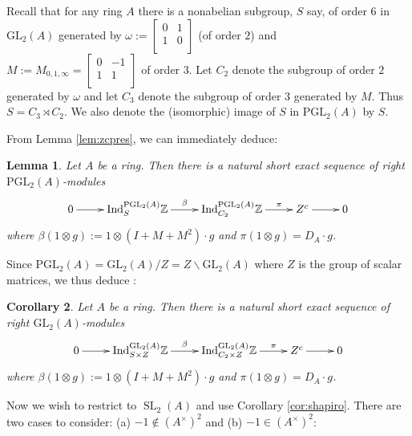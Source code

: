 \documentclass[12pt]{amsart}
\newtheorem{lem}{Lemma}[section]
\newtheorem{cor}[lem]{Corollary}
\theoremstyle{definition}
\newcommand{\Z}{\Bbb{Z}}
\newcommand{\spl}[2]{\operatorname{SL}_{#1}\left(#2\right)}
\newcommand{\gl}[2]{\mathrm{GL}_{#1}(#2)}
\newcommand{\pgl}[2]{\mathrm{PGL}_{#1}(#2)}
\newcommand{\cconst}[1]{D_{#1}}
\newcommand{\<}{\langle}
\renewcommand{\>}{\rangle}
\newcommand{\Ind}[3]{\mathrm{Ind}_{#1}^{#2}#3}
\begin{document}
Recall that for any ring $A$ there is  a  nonabelian subgroup, $S$ say, of order $6$ in $\gl{2}{A}$ generated by 
$\omega:=
\left[
\begin{array}{cc}
0&1\\
1&0\\
\end{array}
\right]$ (of order $2$) and 
$M:=M_{0,1,\infty}=
\left[
\begin{array}{cc}
0&-1\\
1&1\\
\end{array}
\right]$ of order $3$.  Let $C_2$ denote the subgroup of order $2$ generated by $\omega$ and let $C_3$ denote the subgroup of order $3$  generated by $M$.  Thus $S=C_3\rtimes C_2$. We also denote the (isomorphic) image of $S$ in $\pgl{2}{A}$ by $S$.

From Lemma \ref{lem:zcpres}, we can immediately deduce:

\begin{lem}\label{lem:zcperm}  Let $A$ be a ring. Then there is a natural short exact sequence of right $\pgl{2}{A}$-modules
\[
\xymatrix{
0\ar[r]&\Ind{S}{\pgl{2}{A}}\Z\ar^-{\beta}[r]&\Ind{C_2}{\pgl{2}{A}}\Z\ar^-{\pi}[r]&Z^c\ar[r]&0\\
}
\]
where $\beta(1\otimes g):=1\otimes  (I+M+M^2)\cdot g$ and $\pi(1\otimes g)=\cconst{A}\cdot g$.
\end{lem}

Since $\pgl{2}{A}=\gl{2}{A}/Z=Z\backslash \gl{2}{A}$ where $Z$ is the group of scalar matrices,  we thus deduce :
\begin{cor}\label{cor:zcperm}
 Let $A$ be a ring. Then there is a natural short exact sequence of right $\gl{2}{A}$-modules
\[
\xymatrix{
0\ar[r]&\Ind{S\times Z}{\gl{2}{A}}\Z\ar^-{\beta}[r]&\Ind{C_2\times Z}{\gl{2}{A}}\Z\ar^-{\pi}[r]&Z^c\ar[r]&0\\
}
\]
where $\beta(1\otimes g):=1\otimes  (I+M+M^2)\cdot g$ and $\pi(1\otimes g)=\cconst{A}\cdot g$.
\end{cor}


Now we wish to restrict to $\spl{2}{A}$ and use Corollary \ref{cor:shapiro}. There are two cases to consider: (a) $-1\not\in (A^\times)^2$ and (b) $-1\in (A^\times)^2$:
\end{document}
